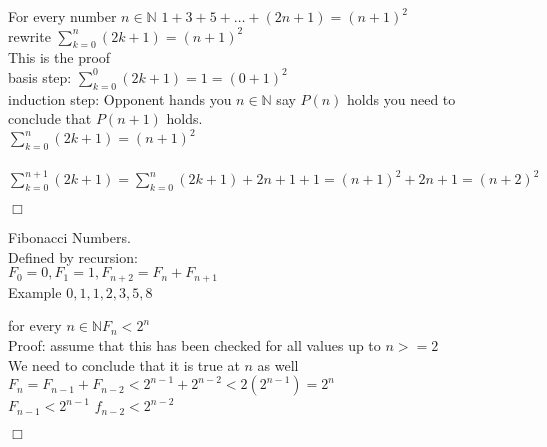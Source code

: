 \documentclass[12pt]{article}
\begin{document}
 For every number $n \in \mathbb{N}$
$1+3+5+\dots+(2n+1) = (n+1)^2$
\\rewrite $\sum_{k=0}^{n} (2k+1) = (n+1)^2$\\

 This is the proof
\\basis step: $\sum_{k=0}^{0}(2k+1) = 1 = (0+1)^2$
\\ induction step: Opponent hands you $n  \in \mathbb{N}$ 
say $P(n)$ holds you need to conclude that $P(n+1)$ holds.\\

$\sum_{k=0}^{n}(2k+1) = (n+1)^2$
\\
\\
$\sum_{k=0}^{n+1}(2k+1)= \sum_{k=0}^{n}(2k+1)+2n+1+1 = (n+1)^2 +2n+1=(n+2)^2$
\begin{flushright}
        $\Box$
\end{flushright}


Fibonacci Numbers.\\
Defined by recursion:\\
$F_0 = 0 ,F_1 = 1,F_{n+2} = F_n +F_{n+1}$\\
Example $0,1,1,2,3,5,8$

 for every $n\in \mathbb{N} F_n < 2^n$
\\ Proof: assume that this has been checked for all values up to $n >= 2$
\\We need to conclude that it is true at $n$ as well\\
$F_n = F_{n-1} +F_{n-2} <2^{n-1}+2^{n-2} <2(2^{n-1}) = 2^n$\\
$F_{n-1} <2^{n-1} $ $f_{n-2} < 2^{n-2} $
\begin{flushright}
        $\Box$
\end{flushright}
\end{document}
